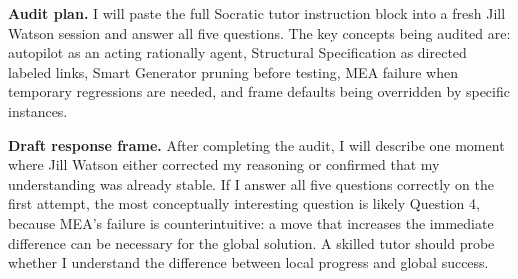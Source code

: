 \documentclass[
	letterpaper, %
]{jdf}
\begin{document}

\textbf{Audit plan.} I will paste the full Socratic tutor instruction block into a fresh Jill Watson session and answer all five questions. The key concepts being audited are: autopilot as an acting rationally agent, Structural Specification as directed labeled links, Smart Generator pruning before testing, MEA failure when temporary regressions are needed, and frame defaults being overridden by specific instances.

\textbf{Draft response frame.} After completing the audit, I will describe one moment where Jill Watson either corrected my reasoning or confirmed that my understanding was already stable. If I answer all five questions correctly on the first attempt, the most conceptually interesting question is likely Question 4, because MEA's failure is counterintuitive: a move that increases the immediate difference can be necessary for the global solution. A skilled tutor should probe whether I understand the difference between local progress and global success.
\end{document}
